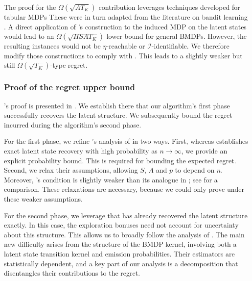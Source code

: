 \documentclass[11pt]{article}
\newcommand{\mcI}{\mathcal{I}}
\theoremstyle{definition}
\theoremstyle{definition}
\begin{document}
The proof for the $\Omega(\sqrt{AT_K})$ contribution leverages techniques developed for tabular \glspl{MDP} \cite{domingues2021episodic,NEURIPS2019_10a5ab2d}
These were in turn adapted from the literature on bandit learning \cite{bubeck2012regret}.
A direct application of \cite{domingues2021episodic}'s construction to the induced \gls{MDP} on the latent states would lead to an $\Omega(\sqrt{HSAT_K})$ lower bound for general \glspl{BMDP}.
However, the resulting instances would not be $\eta$-reachable or $\mcI$-identifiable.
We therefore modify those constructions to comply with .
This leads to a slightly weaker but still $\Omega(\sqrt{T_K})$-type regret.

\subsubsection{Proof of the regret upper bound}

's proof is presented in .
We establish there that our algorithm's first phase successfully recovers the latent structure.
We subsequently bound the regret incurred during the algorithm's second phase.

For the first phase, we refine \cite{Jedra:2022}'s analysis of \cite[Algorithms 1 and 2]{Jedra:2022} in two ways.
First, whereas \cite{Jedra:2022} establishes exact latent state recovery with high probability as $n\rightarrow\infty$, we provide an explicit probability bound.
This is required for bounding the expected regret.
Second, we relax their assumptions, allowing $S$, $A$ and $p$ to depend on $n$.
Moreover, 's condition is slightly weaker than its analogue in \cite{Jedra:2022}; see  for a comparison.
These relaxations are necessary, because we could only prove  under these weaker assumptions.

For the second phase, we leverage that  has already recovered the latent structure exactly.
In this case, the exploration bonuses need not account for uncertainty about this structure.
This allows us to broadly follow the analysis of \cite{UCRLVI}.
The main new difficulty arises from the structure of the \gls{BMDP} kernel, involving both a latent state transition kernel and emission probabilities.
Their estimators are statistically dependent, and a key part of our analysis is a decomposition that disentangles their contributions to the regret.
\end{document}
